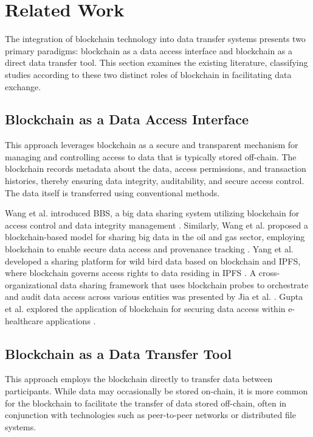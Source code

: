 \documentclass[10pt]{llncs}
\begin{document}
\section{Related Work} \label{related_work}

The integration of blockchain technology into data transfer systems presents two primary paradigms: blockchain as a data access interface and blockchain as a direct data transfer tool.
This section examines the existing literature, classifying studies according to these two distinct roles of blockchain in facilitating data exchange.

\subsection{Blockchain as a Data Access Interface}

This approach leverages blockchain as a secure and transparent mechanism for managing and controlling access to data that is typically stored off-chain.
The blockchain records metadata about the data, access permissions, and transaction histories, thereby ensuring data integrity, auditability, and secure access control.
The data itself is transferred using conventional methods.

Wang et al. introduced BBS, a big data sharing system utilizing blockchain for access control and data integrity management \cite{Wang2024}.
Similarly, Wang et al. proposed a blockchain-based model for sharing big data in the oil and gas sector, employing blockchain to enable secure data access and provenance tracking \cite{WangYY2021}.
Yang et al. developed a sharing platform for wild bird data based on blockchain and IPFS, where blockchain governs access rights to data residing in IPFS \cite{Yang2022}.
A cross-organizational data sharing framework that uses blockchain probes to orchestrate and audit data access across various entities was presented by Jia et al. \cite{Jia2023}.
Gupta et al. explored the application of blockchain for securing data access within e-healthcare applications \cite{Gupta2022}.
\subsection{Blockchain as a Data Transfer Tool}

This approach employs the blockchain directly to transfer data between participants.
While data may occasionally be stored on-chain, it is more common for the blockchain to facilitate the transfer of data stored off-chain,
 often in conjunction with technologies such as peer-to-peer networks or distributed file systems.
\end{document}
